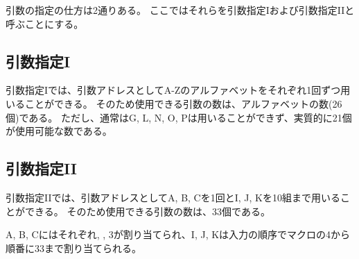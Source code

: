 

引数の指定の仕方は2通りある。
ここではそれらを引数指定Iおよび引数指定IIと呼ぶことにする。


\subsection{引数指定I}
引数指定Iでは、引数アドレスとしてA-Zのアルファベットをそれぞれ1回ずつ用いることができる。
そのため使用できる引数の数は、アルファベットの数(26個)である。
ただし、通常はG, L, N, O, Pは用いることができず、実質的に21個が使用可能な数である。


\subsection{引数指定II}
引数指定IIでは、引数アドレスとしてA, B, Cを1回とI, J, Kを10組まで用いることができる。
そのため使用できる引数の数は、33個である。

A, B, Cにはそれぞれ, , \ttNum3が割り当てられ、I, J, Kは入力の順序でマクロの\ttNum4から順番に\ttNum33まで割り当てられる。


